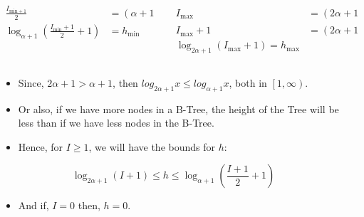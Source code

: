 \begin{frame}
\begin{columns}
\begin{column}{0.5\textwidth}
\begin{block}{}
\[\begin{aligned}
                        \frac{I_{\text{min} + 1}}{2} &= \left(\alpha + 1\right)^{h - 1} \\
                        \log_{\alpha + 1}\left(\frac{I_{\text{min}} + 1}{2} + 1\right) &= h_{\text{min}}
                    \end{aligned}
                \]
            \end{block}
        \end{column}
        \begin{column}{0.5\textwidth}
            \[
                \begin{aligned}
                    I_{\text{max}} &= \left(2\alpha + 1\right)^h - 1 \\
                    I_{\text{max}} + 1 &= \left(2\alpha + 1\right)^h \\
                    \log_{2\alpha + 1} \left(I_{\text{max}} + 1\right) = h_{\text{max}}
                \end{aligned}
            \]
        \end{column}
    \end{columns}

    \framebreak

    \begin{columns}
        \begin{column}{\textlecolumn}
            \begin{block}{}
                \begin{itemize}
                    \item Since, \(2\alpha + 1 > \alpha + 1\), then \(log_{2\alpha + 1} x \leq log_{\alpha + 1}x\), both in \(\left[1, \infty\right)\).
                    \item Or also, if we have more nodes in a B-Tree, the height of the Tree will be less than if we have less nodes in the B-Tree.
                    \item Hence, for \(I \geq 1\), we will have the bounds for \(h\):
                \end{itemize}
                \[
                    \log_{2\alpha + 1}\left(I + 1\right)
                    \leq
                    h
                    \leq
                    \log_{\alpha + 1}\left(\frac{I + 1}{2} + 1\right)
                \]
                \begin{itemize}
                    \item And if, \(I = 0\) then, \(h = 0\).
                \end{itemize}
            \end{block}
        \end{column}
        \begin{column}{\textricolumn}
        \end{column}
    \end{columns}
\end{frame}
